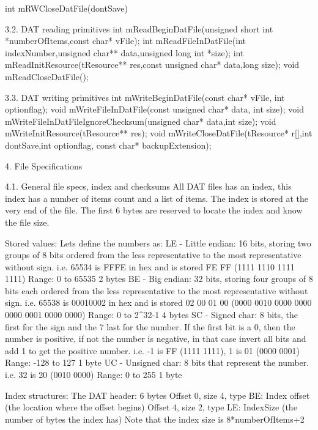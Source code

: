  int mRWCloseDatFile(dontSave)

3.2. DAT reading primitives
 int  mReadBeginDatFile(unsigned short int *numberOfItems,const char* vFile);
 int  mReadFileInDatFile(int indexNumber,unsigned char** data,unsigned long int
*size);
 int  mReadInitResource(tResource** res,const unsigned char* data,long size);
 void mReadCloseDatFile();

3.3. DAT writing primitives
 int  mWriteBeginDatFile(const char* vFile, int optionflag);
 void mWriteFileInDatFile(const unsigned char* data, int size);
 void mWriteFileInDatFileIgnoreChecksum(unsigned char* data,int size);
 void mWriteInitResource(tResource** res);
 void mWriteCloseDatFile(tResource* r[],int dontSave,int optionflag, const char*
backupExtension);

4. File Specifications

4.1. General file specs, index and checksums
 All DAT files has an index, this index has a number of items count and
 a list of items.
 The index is stored at the very end of the file.
 The first 6 bytes are reserved to locate the index and know the file size.

 Stored values:
 Lets define the numbers as:
  LE - Little endian: 16 bits, storing two groups of 8 bits ordered from
       the less representative to the most representative without sign.
       i.e. 65534 is FFFE in hex and is stored FE FF (1111 1110 1111 1111)
       Range: 0 to 65535
       2 bytes
  BE - Big endian: 32 bits, storing four groups of 8 bits each ordered from
       the less representative to the most representative without sign.
       i.e. 65538 is 00010002 in hex and is stored 02 00 01 00
       (0000 0010 0000 0000 0000 0001 0000 0000)
       Range: 0 to 2^32-1
       4 bytes
  SC - Signed char: 8 bits, the first for the sign and the 7 last for the
       number. If the first bit is a 0, then the number is positive, if not
       the number is negative, in that case invert all bits and add 1 to
       get the positive number.
       i.e. -1 is FF (1111 1111), 1 is 01 (0000 0001)
       Range: -128 to 127
       1 byte
  UC - Unsigned char: 8 bits that represent the number.
       i.e. 32 is 20 (0010 0000)
       Range: 0 to 255
       1 byte

 Index structures:
 The DAT header: 6 bytes
  Offset 0, size 4, type BE: Index offset (the location where the offset
                             begins)
  Offset 4, size 2, type LE: IndexSize (the number of bytes the index has)
                             Note that the index size is 8*numberOfItems+2


